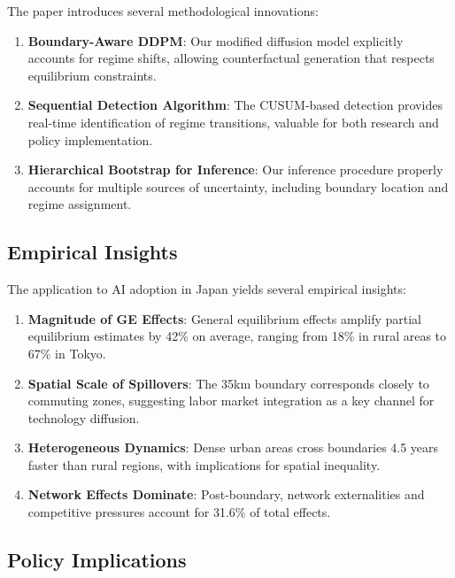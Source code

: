 The paper introduces several methodological innovations:

\begin{enumerate}
\item \textbf{Boundary-Aware DDPM}: Our modified diffusion model explicitly accounts for regime shifts, allowing counterfactual generation that respects equilibrium constraints.

\item \textbf{Sequential Detection Algorithm}: The CUSUM-based detection provides real-time identification of regime transitions, valuable for both research and policy implementation.

\item \textbf{Hierarchical Bootstrap for Inference}: Our inference procedure properly accounts for multiple sources of uncertainty, including boundary location and regime assignment.
\end{enumerate}

\subsection{Empirical Insights}

The application to AI adoption in Japan yields several empirical insights:

\begin{enumerate}
\item \textbf{Magnitude of GE Effects}: General equilibrium effects amplify partial equilibrium estimates by 42\% on average, ranging from 18\% in rural areas to 67\% in Tokyo.

\item \textbf{Spatial Scale of Spillovers}: The 35km boundary corresponds closely to commuting zones, suggesting labor market integration as a key channel for technology diffusion.

\item \textbf{Heterogeneous Dynamics}: Dense urban areas cross boundaries 4.5 years faster than rural regions, with implications for spatial inequality.

\item \textbf{Network Effects Dominate}: Post-boundary, network externalities and competitive pressures account for 31.6\% of total effects.
\end{enumerate}

\subsection{Policy Implications}

